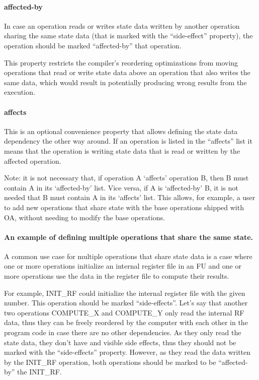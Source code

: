 \documentclass[a4paper,twoside]{tceusermanual}
\begin{document}
\paragraph{affected-by}

In case an operation reads or writes state data written by another 
operation sharing the same state data (that is marked with the
``side-effect'' property), the operation should be marked ``affected-by''
that operation. 

This property restricts the compiler's reordering optimizations 
from moving operations that read or write state data above an operation
that also writes the same data, which would result in potentially
producing wrong results from the execution.

\paragraph{affects}

This is an optional convenience property that allows defining
the state data dependency the other way around. If an operation
is listed in the ``affects'' list it means that the operation
is writing state data that is read or written by the affected operation.

Note: it is not necessary that, if operation A `affects' operation B, then B
must contain A in its `affected-by' list.  Vice versa, if A is `affected-by'
B, it is not needed that B must contain A in its `affects' list. This
allows, for example, a user to add new operations that share state with 
the base operations shipped with OA, without needing to modify the base
operations.

\paragraph{An example of defining multiple operations that share the
same state.} A common use case for multiple operations that share
state data is a case where one or more operations initialize an
internal register file in an FU and one or more operations use the
data in the register file to compute their results.

For example, INIT\_RF could initialize the internal register
file with the given number. This operation should be marked
``side-effects''. Let's say that another two operations COMPUTE\_X and
COMPUTE\_Y only read the internal RF data, thus they can be freely
reordered by the computer with each other in the program code in case
there are no other dependencies. As they only read the state data,
they don't have and visible side effects, thus they should not
be marked with the ``side-effects'' property. However, as they read
the data written by the INIT\_RF operation, both operations should
be marked to be ``affected-by'' the INIT\_RF.
\end{document}
